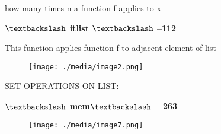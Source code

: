 \documentclass[12pt]{article}
\renewcommand{\_}{\kern-1.5pt\textunderscore\kern-1.5pt}
\begin{document}
{\fontsize{14pt}{16.8pt}\selectfont how many times n a function f applies to x\par}\par


\vspace{\baselineskip}
{\fontsize{14pt}{16.8pt}\selectfont \textbf{$\textbackslash$  itlist $\textbackslash$  --112}\par}\par


\vspace{\baselineskip}

\vspace{\baselineskip}
{\fontsize{14pt}{16.8pt}\selectfont This function applies function f to adjacent element of list\par}\par




\begin{figure}[H]
	\begin{Center}
		\texttt{[image: ./media/image2.png]}
	\end{Center}
\end{figure}



\par


\vspace{\baselineskip}

\vspace{\baselineskip}
{\fontsize{14pt}{16.8pt}\selectfont SET OPERATIONS ON LIST:\par}\par


\vspace{\baselineskip}
{\fontsize{14pt}{16.8pt}\selectfont \textbf{$\textbackslash$ mem$\textbackslash$  -- 263}\par}\par




\begin{figure}[H]
	\begin{Center}
		\texttt{[image: ./media/image7.png]}
	\end{Center}
\end{figure}
\end{document}
